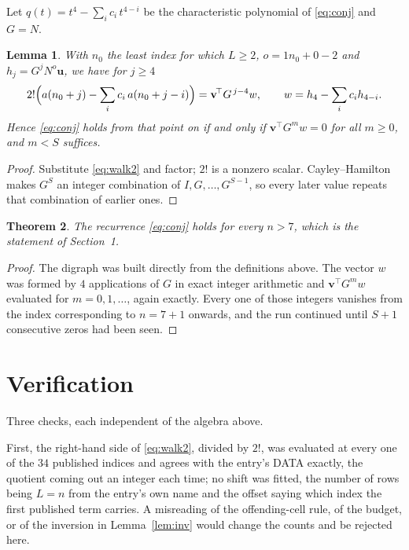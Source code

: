 \documentclass[11pt,a4paper]{article}
\theoremstyle{plain}
\newtheorem{theorem}{Theorem}
\newtheorem{lemma}[theorem]{Lemma}
\theoremstyle{definition}
\begin{document}
Let $q(t)=t^{4}-\sum_i c_i\,t^{4-i}$ be the characteristic polynomial of
\eqref{eq:conj} and $G=N$.

\begin{lemma}\label{lem:crit}
With $n_0$ the least index for which $L\ge2$, $o=1n_0+0-2$ and
$h_j=G^{j}N^{o}\mathbf{u}$, we have for $j\ge4$
\[
2!\Bigl(a(n_0+j)-\sum_i c_i\,a(n_0+j-i)\Bigr)=\mathbf{v}^{\!\top}G^{\,j-4}w,
\qquad w=h_{4}-\sum_i c_i h_{4-i} .
\]
Hence \eqref{eq:conj} holds from that point on if and only if
$\mathbf{v}^{\!\top}G^{m}w=0$ for all $m\ge0$, and $m<S$ suffices.
\end{lemma}

\begin{proof}
Substitute \eqref{eq:walk2} and factor; $2!$ is a nonzero scalar. Cayley--Hamilton
makes $G^{S}$ an integer combination of $I,G,\dots,G^{S-1}$, so every later value repeats
that combination of earlier ones.
\end{proof}

\begin{theorem}
The recurrence \eqref{eq:conj} holds for every $n>7$, which is the statement of
Section~1.
\end{theorem}

\begin{proof}
The digraph was built directly from the definitions above. The vector $w$ was formed by
$4$ applications of $G$ in exact integer arithmetic and $\mathbf{v}^{\!\top}G^{m}w$
evaluated for $m=0,1,\dots$, again exactly. Every one of those integers vanishes from the
index corresponding to $n=7+1$ onwards, and the run continued until $S+1$ consecutive
zeros had been seen.
\end{proof}

\section{Verification}

Three checks, each independent of the algebra above.

First, the right-hand side of \eqref{eq:walk2}, divided by $2!$, was evaluated at every
one of the $34$ published indices and agrees with the entry's DATA exactly, the quotient
coming out an integer each time; no shift was fitted, the number of rows being
$L=n$ from the entry's own name and the offset saying which index the first published
term carries. A misreading of the offending-cell rule, of the budget, or of the inversion in
Lemma~\ref{lem:inv} would change the counts and be rejected here.
\end{document}
